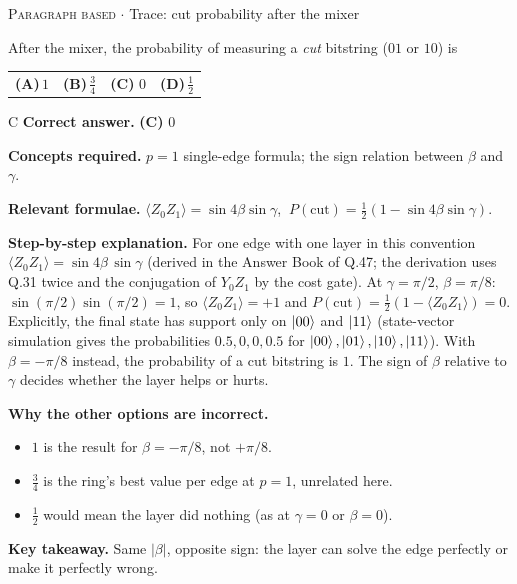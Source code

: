 \documentclass[11pt,a4paper]{article}
\newcommand{\optlabel}[1]{\textbf{(#1)}}
\newcommand{\correctlabel}[1]{\textcolor{okgreen}{\textbf{(#1)}\,\ding{51}}}
\newenvironment{qitem}[1]{\begin{list}{}{\setlength{\leftmargin}{3.3em}\setlength{\labelwidth}{3.1em}%
  \setlength{\labelsep}{0.2em}\setlength{\topsep}{3pt}\setlength{\parsep}{3pt}}\item[\textbf{Q.#1}\hfill]}{\end{list}}
\newcommand{\qsep}{\par\vspace{2pt}{\color{black!15}\hrule}\vspace{4pt}}
\newcommand{\qmeta}[2]{{\footnotesize\color{black!60}\textsc{#1} \;$\cdot$\; #2}\par}
\begin{document}
\begin{qitem}{40}
\qmeta{Paragraph based}{Trace: cut probability after the mixer}
After the mixer, the probability of measuring a \emph{cut} bitstring ($01$ or $10$) is
\par\smallskip\noindent\begin{tabularx}{\linewidth}{@{}*{4}{L}@{}}
\optlabel{A}\,$1$ & \optlabel{B}\,$\tfrac34$ & \correctlabel{C}\,$0$ & \optlabel{D}\,$\tfrac12$
\end{tabularx}
\end{qitem}
\begin{solbox}{C}
\textbf{\color{brand}Correct answer.} \textcolor{okgreen}{\textbf{(C)}} $0$

\textbf{\color{brand}Concepts required.} $p = 1$ single-edge formula; the sign relation between $\beta$ and $\gamma$.

\textbf{\color{brand}Relevant formulae.} $\langle Z_0Z_1\rangle = \sin4\beta\sin\gamma$, $\ P(\text{cut}) = \tfrac12(1 - \sin4\beta\sin\gamma)$.

\textbf{\color{brand}Step-by-step explanation.} For one edge with one layer in this convention $\langle Z_0Z_1\rangle = \sin4\beta\,\sin\gamma$ (derived in the Answer Book of Q.47;
the derivation uses Q.31 twice and the conjugation of $Y_0Z_1$ by the cost gate). At $\gamma = \pi/2$, $\beta = \pi/8$:
$\sin(\pi/2)\sin(\pi/2) = 1$, so $\langle Z_0Z_1\rangle = +1$ and $P(\text{cut}) = \tfrac12(1 - \langle Z_0Z_1\rangle) = 0$.
Explicitly, the final state has support only on $\ket{00}$ and $\ket{11}$ (state-vector simulation gives the probabilities
$0.5, 0, 0, 0.5$ for $\ket{00}, \ket{01}, \ket{10}, \ket{11}$). With $\beta = -\pi/8$ instead, the probability of a cut bitstring is $1$. The sign of $\beta$
relative to $\gamma$ decides whether the layer helps or hurts.

\textbf{\color{brand}Why the other options are incorrect.}
\begin{itemize}[leftmargin=2.4em, itemsep=1pt, topsep=2pt]
\item[\textbf{(A)}] $1$ is the result for $\beta = -\pi/8$, not $+\pi/8$.
\item[\textbf{(B)}] $\frac34$ is the ring's best value per edge at $p = 1$, unrelated here.
\item[\textbf{(D)}] $\frac12$ would mean the layer did nothing (as at $\gamma = 0$ or $\beta = 0$).
\end{itemize}
\textbf{\color{brand}Key takeaway.} Same $|\beta|$, opposite sign: the layer can solve the edge perfectly or make it perfectly wrong.
\end{solbox}
\qsep
\end{document}
